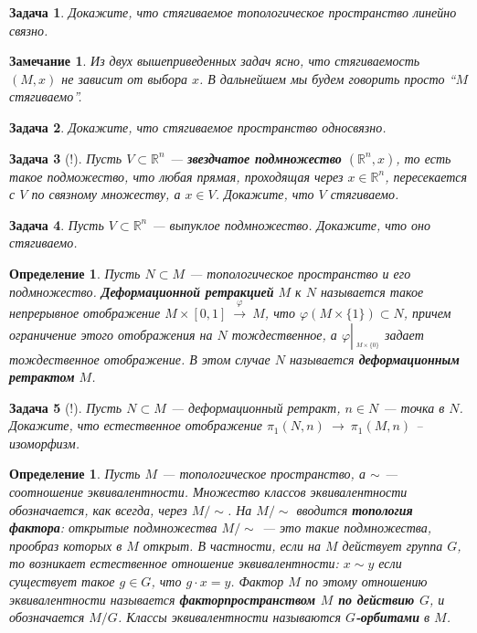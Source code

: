 \documentclass[12pt]{book}
\newcommand{\arrow}{{\:\longrightarrow\:}}
\newcommand{\restrict}[1]{{\left|_{{\phantom{|}\!\!}_{#1}}\right.}}
\renewcommand{\phi}{\varphi}
\def\R{{\mathbb R}}
\theoremstyle{upshape}
\newtheorem{zadacha}{Задача}[chapter]
\theoremstyle{generic}
\newtheorem{opredelenie}[teorema]{Определение}
\theoremstyle{upshapenonumber}
\newtheorem{zamechanie}{Замечание}[chapter]
\newcommand{\следствие}{%
     \refstepcounter{teorema}
     {\noindent\bf Следствие \thechapter.\arabic{teorema}:\ }}
\newcommand{\пример}{%
     \refstepcounter{teorema}
     {\noindent\bf Пример \thechapter.\arabic{teorema}:\ }}
\newcommand{\лемма}{%
     \refstepcounter{teorema}
     {\noindent\bf Лемма \thechapter.\arabic{teorema}:\ }}
\newcommand{\теорема}{%
     \refstepcounter{teorema}
     {\noindent\bf Теорема \thechapter.\arabic{teorema}:\ }}
\newcommand{\утверждение}{%
     \refstepcounter{teorema}
     {\noindent\bf Утверждение \thechapter.\arabic{teorema}:\ }}
\begin{document}
{\begin{zadacha}
Докажите, что стягиваемое топологическое пространство линейно связно.
\end{zadacha}

\begin{zamechanie}
Из двух вышеприведенных задач ясно, что
стягиваемость $(M, x)$ не зависит от
выбора $x$. В дальнейшем мы будем
говорить просто ``$M$ стягиваемо''.
\end{zamechanie}

\begin{zadacha} 
Докажите, что стягиваемое пространство односвязно.
\end{zadacha}

\begin{zadacha}[!]
Пусть $V\subset \R^n$ --- {\bf звездчатое подмножество}
$(\R^n, x)$, то есть такое подможество, что любая прямая, проходящая
через $x\in \R^n$, пересекается с $V$ по связному множеству,
а $x\in V$. Докажите, что $V$ стягиваемо.
\end{zadacha}

\begin{zadacha}
Пусть $V\subset \R^n$ --- выпуклое подмножество.
Докажите, что оно стягиваемо.
\end{zadacha}

\begin{opredelenie}
Пусть $N\subset M$ --- топологическое пространство
и его подмножество. {\bf Деформационной ретракцией}
$M$ к $N$ называется такое непрерывное отображение
$M \times [0,1] \stackrel \phi\arrow M$,
что $\phi(M\times \{1\}) \subset N$,
причем ограничение этого отображения на $N$
тождественное,  а $\phi \restrict{M\times \{0\}}$
задает тождественное отображение. В этом случае
$N$ называется {\bf деформационным ретрактом} $M$.
\end{opredelenie}

\begin{zadacha}[!]
Пусть $N\subset M$ --- деформационный 
ретракт, $n\in N$ --- точка в $N$.
Докажите, что естественное отображение 
$\pi_1(N, n)\arrow \pi_1(M, n)$ --
изоморфизм.
\end{zadacha}

\begin{opredelenie}
Пусть $M$ --- топологическое пространство, 
а $\sim$ --- соотношение эквивалентности. 
Множество классов эквивалентности обозначается,
как всегда, через $M/\sim$. 
На $M/\sim$ вводится {\bf топология фактора}:
открытые подмножества
$M/\sim$ --- это такие подмножества, прообраз
которых в $M$ открыт.
В частности, если на $M$ действует группа $G$, то возникает
естественное отношение эквивалентности: $x \sim y$ если
существует такое $g \in G$, что $g \cdot x = y$.
Фактор $M$ по этому отношению эквивалентности называется
{\bf факторпространством $M$ по действию $G$}, и обозначается
$M/G$. Классы эквивалентности называются {\bf $G$-орбитами}
в $M$.
\end{opredelenie}

}
\end{document}
